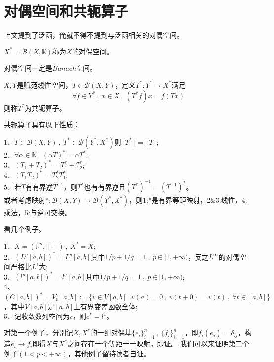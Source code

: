\section{对偶空间和共轭算子}
上文提到了泛函，俺就不得不提到与泛函相关的对偶空间。
\begin{definition}[对偶空间]
    $X^*=\mathscr{B}(X,\mathbb{K})$称为$X$的对偶空间。
\end{definition}
对偶空间一定是$Banach$空间。
\begin{definition}[共轭算子]
    $X,Y$是赋范线性空间，$T \in \mathscr{B}(X,Y)$，定义$T^*:Y^* \to X^*$满足
    \[\forall f \in Y^* \ , \ x \in X \ , \ (T^*f)x=f(Tx)\]
    则称$T^*$为共轭算子。
\end{definition}
共轭算子具有以下性质：
\begin{theorem}
    1、$T \in \mathscr{B}(X,Y) \ , \ T^* \in \mathscr{B}(Y^*,X^*)$则$||T^*||=||T||$;\\
    2、$\forall \alpha \in \mathbb{K} \ , \ (\alpha T)^*=\alpha T^*$;\\
    3、$(T_1+T_2)^*=T_1^*+T_2^*$;\\
    4、$(T_1T_2)^*=T_2^*T_1^*$;\\
    5、若$T$有有界逆$T^{-1}$，则$T^*$也有有界逆且$(T^*)^{-1}=(T^{-1})^*$。\\
    或者考虑映射$*:\mathscr{B}(X,Y) \to \mathscr{B}(Y^*,X^*)$，则1:*是有界等距映射，2\&3:线性，4:乘法，5:与逆可交换。
\end{theorem} 
看几个例子。
\begin{proposition}
    1、$X=(\mathbb{R}^n,||\cdot||) \ , \ X^*=X$;\\
    2、$(L^p[a,b])^*=L^q[a,b]$其中$1/p+1/q=1 \ , \ p \in [1,+\infty)$，反之$L^{\infty}$的对偶空间严格比$L^1$大;\\
    3、$(l^p[a,b])^*=l^q[a,b]$其中$1/p+1/q=1 \ , \ p \in [1,+\infty)$;\\
    4、$(C[a,b])^*=V_0[a,b]:=\{v \in V[a,b] \, | \, v(a)=0 \ , \ v(t+0)=v(t) \ , \ \forall t \in [a,b]\}$，其中$V[a,b]$是$[a,b]$上有界变差函数全体;\\
    5、记收敛数列空间为$c$，则$c^*=l^1$。
\end{proposition}
对第一个例子，分别记$X,X^*$的一组对偶基$\{e_i\}_{i=1}^n \ , \ \{f_i\}_{i=1}^n$，即$f_i(e_j)=\delta_{ij}$，构造$e_i \to f_i$即得$X$与$X^*$之间存在一个等距一一映射，即证。
我们可以来证明第二个例子$(1<p<+\infty)$，其他例子留待读者自证。

